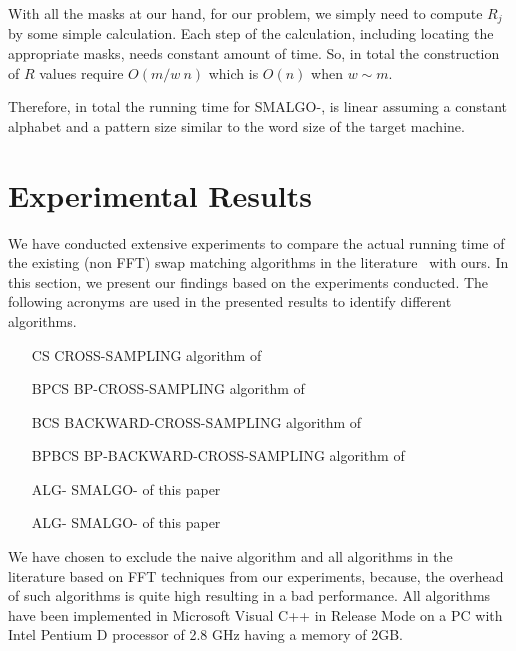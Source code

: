 \documentclass{llncs}
\newcommand{\rom}[1]{\uppercase\expandafter{\romannumeral #1\relax}}
\begin{document}
{With all the masks at our hand, for our problem, we simply need to compute $R_{j}$ by some simple calculation. Each step of the calculation, including locating the appropriate masks, needs constant amount of time. So, in total the construction of $R$ values require $O(m/w ~n)$ which is $O(n)$ when $w \sim m$.

 
Therefore, in total the running time for SMALGO-\rom{2}, is linear
assuming a constant alphabet and a pattern size similar to the word size of the target machine.

















\section{Experimental Results}\label{experiment}

We have conducted extensive experiments to compare the actual running time of the existing (non FFT) swap matching algorithms in the literature~\cite{CS,CCS} with ours. In this section, we present our findings based on the experiments conducted. The following acronyms are used in the presented results to identify different algorithms.


\begin{itemize}
\item[CS] CROSS-SAMPLING algorithm of~\cite{CS}
\item[BPCS] BP-CROSS-SAMPLING algorithm of~\cite{CS}
\item[BCS] BACKWARD-CROSS-SAMPLING algorithm of~\cite{CCS}
\item[BPBCS] BP-BACKWARD-CROSS-SAMPLING algorithm of~\cite{CCS}
\item[ALG-\rom{1}] SMALGO-\rom{1} of this paper
\item[ALG-\rom{2}] SMALGO-\rom{2} of this paper
\end{itemize} 

 


We have chosen to exclude the naive algorithm and all algorithms in the literature based on FFT techniques from our experiments, because, the overhead of such algorithms is quite high resulting in a bad performance. All algorithms have been implemented in Microsoft Visual C++ in Release Mode on a PC with Intel Pentium D processor of 2.8 GHz having a memory of 2GB.

}
\end{document}
